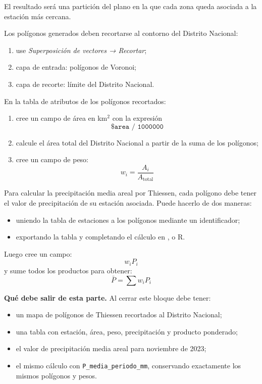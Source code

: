 \documentclass[11pt]{article}
\begin{document}
El resultado será una partición del plano en la que cada zona queda asociada a la
estación más cercana.


Los polígonos generados deben recortarse al contorno del Distrito Nacional:
\begin{enumerate}
  \item use \emph{Superposición de vectores → Recortar};
  \item capa de entrada: polígonos de Voronoi;
  \item capa de recorte: límite del Distrito Nacional.
\end{enumerate}


En la tabla de atributos de los polígonos recortados:
\begin{enumerate}
  \item cree un campo de área en km$^2$ con la expresión
        \[
          \texttt{\$area / 1000000}
        \]
  \item calcule el área total del Distrito Nacional a partir de la suma de los polígonos;
  \item cree un campo de peso:
        \[
          w_i = \frac{A_i}{A_{\text{total}}}
        \]
\end{enumerate}


Para calcular la precipitación media areal por Thiessen, cada polígono debe tener
el valor de precipitación de su estación asociada. Puede hacerlo de dos maneras:
\begin{itemize}
  \item uniendo la tabla de estaciones a los polígonos mediante un identificador;
  \item exportando la tabla y completando el cálculo en \excel{}, \python{} o R.
\end{itemize}

Luego cree un campo:
\[
  w_i P_i
\]
y sume todos los productos para obtener:
\[
  \bar{P} = \sum w_i P_i
\]

\begin{olivebox}
\textbf{Qué debe salir de esta parte.}
Al cerrar este bloque debe tener:
\begin{itemize}
  \item un mapa de polígonos de Thiessen recortados al Distrito Nacional;
  \item una tabla con estación, área, peso, precipitación y producto ponderado;
  \item el valor de precipitación media areal para noviembre de 2023;
  \item el mismo cálculo con \texttt{P\_media\_periodo\_mm}, conservando
        exactamente los mismos polígonos y pesos.
\end{itemize}
\end{olivebox}
\end{document}
